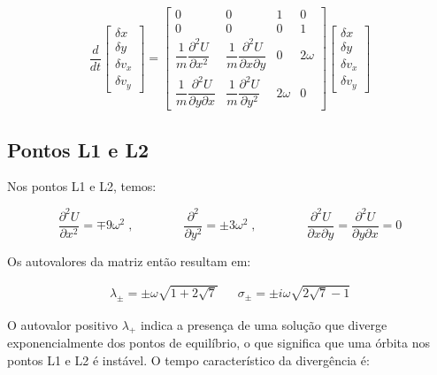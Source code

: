 \begin{equation}
\frac{d}{dt}
  \begin{bmatrix}
    \delta x \\
    \delta y \\
    \delta v_x \\
    \delta v_y
 \end{bmatrix}
=
 \begin{bmatrix}
   0 & 0 & 1 & 0 \\
   0 & 0 & 0 & 1 \\
   \dfrac{1}{m} \dfrac{\partial ^2U}{\partial x^2} & \dfrac{1}{m} \dfrac{\partial ^2U}{\partial x\partial y} & 0 & 2\omega \\
   \dfrac{1}{m} \dfrac{\partial ^2U}{\partial y \partial x} & \dfrac{1}{m} \dfrac{\partial ^2U}{\partial y^2} & 2\omega & 0
 \end{bmatrix}
   \begin{bmatrix}
    \delta x \\
    \delta y \\
    \delta v_x \\
    \delta v_y
 \end{bmatrix}
\end{equation}

\subsection{Pontos L1 e L2}

Nos pontos L1 e L2, temos:

\begin{equation}
\dfrac{\partial ^2U}{\partial x^2} = \mp 9\omega^2 \;, \qquad \qquad \dfrac{\partial ^2}{\partial y^2} = \pm 3\omega^2 \;, \qquad \qquad \dfrac{\partial ^2U}{\partial x\partial y} = \dfrac{\partial ^2U}{\partial y\partial x} = 0
\end{equation}

\vspace{10px}

Os autovalores da matriz então resultam em:

\vspace{-13px}

\begin{align}
\lambda_{\pm} = \pm \omega \sqrt{1+2\sqrt{7}} && \sigma_{\pm} = \pm i\omega \sqrt{2\sqrt{7}-1}
\end{align}

O autovalor positivo $\lambda_+$ indica a presença de uma solução que diverge exponencialmente dos pontos de equilíbrio, o que significa que uma órbita nos pontos L1 e L2 é instável. O tempo característico da divergência é:

